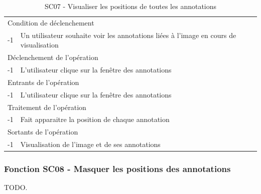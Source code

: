 \documentclass[a4paper]{article}
\begin{document}
\begin{table}[H]
  \centering
   \small
	\begin{tabular}{|c|p{12cm}|}
   		\hline
   			\rowcolor{lightgray}\multicolumn{2}{|c|}{\textbf{SC07 - Visualiser les positions de toutes les annotations}} \\
   		\hline
   			\multicolumn{2}{|l|}{Condition de d\'eclenchement} \\
   		\hline
   			-1 & Un utilisateur souhaite voir les annotations liées à l’image en cours de visualisation\\
   		\hline
   			\multicolumn{2}{|l|}{D\'eclenchement de l'op\'eration} \\
   		\hline
   			-1 & L’utilisateur clique sur la fenêtre des annotations\\
   		\hline
   			\multicolumn{2}{|l|}{Entrants de l'op\'eration} \\
   		\hline
   			-1 & L’utilisateur clique sur la fenêtre des annotations\\
   		\hline
   			\multicolumn{2}{|l|}{Traitement de l'op\'eration} \\
  		\hline
   			-1 & Fait apparaitre la position de chaque annotation\\
   		\hline
   			\multicolumn{2}{|l|}{Sortants de l'op\'eration} \\
   		\hline
   			-1 & Visualisation de l’image et de ses annotations\\
   		\hline
	\end{tabular}
  \caption{SC07 - Visualiser les positions de toutes les annotations}
  \normalsize
  \label{tab:visualiser_position_annotation}
\end{table}

\subsubsection{Fonction SC08 - Masquer les positions des annotations}
TODO.\\
\end{document}
